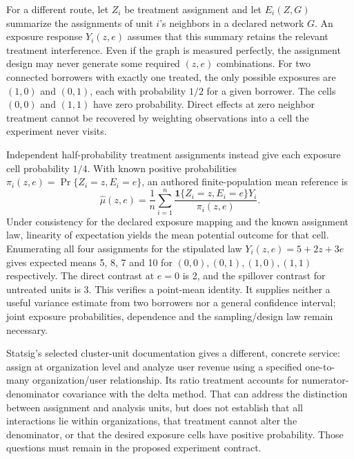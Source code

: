 For a different route, let $Z_i$ be treatment assignment and let
$E_i(Z,G)$ summarize the assignments of unit $i$'s neighbors in a declared
network $G$. An exposure response $Y_i(z,e)$ assumes that this summary retains
the relevant treatment interference. Even if the graph is measured perfectly,
the assignment design may never generate some required $(z,e)$ combinations.
For two connected borrowers with exactly one treated, the only possible
exposures are $(1,0)$ and $(0,1)$, each with probability $1/2$ for a given
borrower. The cells $(0,0)$ and $(1,1)$ have zero probability. Direct effects at
zero neighbor treatment cannot be recovered by weighting observations into a
cell the experiment never visits. \citep{exec20_network_reference}

Independent half-probability treatment assignments instead give each exposure
cell probability $1/4$. With known positive probabilities
$\pi_i(z,e)=\Pr\{Z_i=z,E_i=e\}$, an authored finite-population mean reference is
\begin{equation}
 \widehat\mu(z,e)=\frac1n\sum_{i=1}^n
 \frac{\mathbf{1}\{Z_i=z,E_i=e\}Y_i}{\pi_i(z,e)}.
 \label{exec20:network-ht}
\end{equation}
Under consistency for the declared exposure mapping and the known assignment
law, linearity of expectation yields the mean potential outcome for that cell.
Enumerating all four assignments for the stipulated law $Y_i(z,e)=5+2z+3e$
gives expected means 5, 8, 7 and 10 for $(0,0),(0,1),(1,0),(1,1)$ respectively.
The direct contrast at $e=0$ is 2, and the spillover contrast for untreated units
is 3. This verifies a point-mean identity. It supplies neither a useful variance
estimate from two borrowers nor a general confidence interval; joint exposure
probabilities, dependence and the sampling/design law remain necessary.
\citep{exec20_network_reference}

Statsig's selected cluster-unit documentation gives a different, concrete
service: assign at organization level and analyze user revenue using a specified
one-to-many organization/user relationship. Its ratio treatment accounts for
numerator-denominator covariance with the delta method. That can address the
distinction between assignment and analysis units, but does not establish that
all interactions lie within organizations, that treatment cannot alter the
denominator, or that the desired exposure cells have positive probability.
Those questions must remain in the proposed experiment contract.
\citep{exec20_network_statsig_units}

